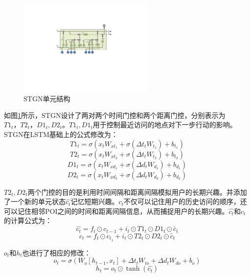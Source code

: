 \documentclass[master]{thesis-uestc}
\begin{document}
\begin{figure}[!ht]
\centering 
\includegraphics[width=0.6\textwidth]{./pic/stgn.pdf}
\caption{STGN单元结构}
\label{Figure.2.11}
\end{figure}
如图\ref{Figure.2.11}所示，STGN设计了两对两个时间门控和两个距离门控，分别表示为$T1_t，T2_t，D1_t,D2_t$。$T1_t,D1_t$用于控制最近访问的地点对下一步行动的影响。STGN在LSTM基础上的公式修改为：
\begin{equation}
   T1_t=\sigma(x_tW_{xt_1}+\sigma(\Delta t_tW_{t_1})+b_{t_1})
\end{equation}
\begin{equation}
   T2_t=\sigma(x_tW_{xt_2}+\sigma(\Delta t_tW_{t_2})+b_{t_2})
\end{equation}
\begin{equation}
   D1_t=\sigma(x_tW_{xd_1}+\sigma(\Delta d_tW_{d_1})+b_{d_1})
\end{equation}
\begin{equation}
   D2_t=\sigma(x_tW_{xd_2}+\sigma(\Delta d_tW_{d_2})+b_{d_2})
\end{equation}

$T2_t,D2_t$两个门控的目的是利用时间间隔和距离间隔模拟用户的长期兴趣。并添加了一个新的单元状态$\hat{c_t}$记忆短期兴趣。$c_t$不仅可以记住用户的历史访问的顺序，还可以记住相邻POI之间的时间和距离间隔信息，从而捕捉用户的长期兴趣。$\hat{c_t}$和$c_t$的计算公式为：
\begin{equation}
   \hat{c_t}=f_t\odot c_{t-1}+i_t \odot T1_t \odot D1_t \odot \tilde{c_t}
\end{equation}
\begin{equation}
   c_t=f_t \odot c_{t_1}+i_t \odot T2_t \odot D2_t \odot \tilde{c_t}
\end{equation}

$o_t$和$h_t$也进行了相应的修改：
\begin{equation}
   o_t=\sigma(W_o[h_{t-1},x_t]+\Delta t_tW_{to}+\Delta d_tW_{do}+b_o)
\end{equation}
\begin{equation}
   h_t=o_t \odot \tanh(\hat{c_t})
\end{equation}
\end{document}
